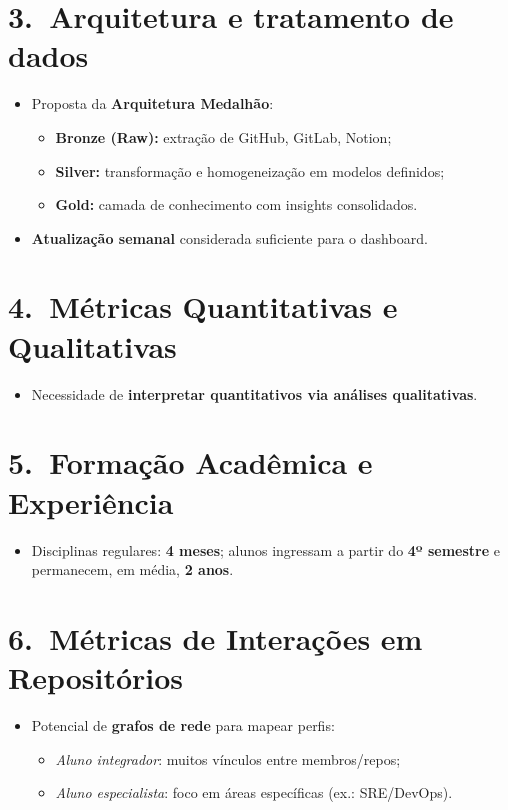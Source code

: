 \documentclass[
	12pt,
	openright,
	oneside,
	a4paper,
	brazil
]{abntex2}
\begin{document}
\begin{apendicesenv}
\section*{3.\ Arquitetura e tratamento de dados}
\begin{itemize}
\item Proposta da \textbf{Arquitetura Medalhão}:
\begin{itemize}
\item \textbf{Bronze (Raw):} extração de GitHub, GitLab, Notion;
\item \textbf{Silver:} transformação e homogeneização em modelos definidos;
\item \textbf{Gold:} camada de conhecimento com insights consolidados.
\end{itemize}
\item \textbf{Atualização semanal} considerada suficiente para o dashboard.
\end{itemize}

\section*{4.\ Métricas Quantitativas e Qualitativas}
\begin{itemize}
\item Necessidade de \textbf{interpretar quantitativos via análises qualitativas}.
\end{itemize}

\section*{5.\ Formação Acadêmica e Experiência}
\begin{itemize}
\item Disciplinas regulares: \textbf{4 meses}; alunos ingressam a partir do \textbf{4º semestre} e permanecem, em média, \textbf{2 anos}.
\end{itemize}

\section*{6.\ Métricas de Interações em Repositórios}
\begin{itemize}
\item Potencial de \textbf{grafos de rede} para mapear perfis:
\begin{itemize}
\item \textit{Aluno integrador}: muitos vínculos entre membros/repos;
\item \textit{Aluno especialista}: foco em áreas específicas (ex.: SRE/DevOps).
\end{itemize}
\end{itemize}


\end{apendicesenv}
\end{document}
